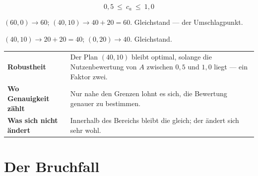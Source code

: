 \begin{merksatz}
\[ \boxed{\ 0{,}5 \ \le\ c_a \ \le\ 1{,}0\ } \]

 $(60,0) \to 60$; $(40,10) \to 40+20 = 60$. Gleichstand --- der Umschlagpunkt. \checkmark

 $(40,10) \to 20+20 = 40$; $(0,20) \to 40$. Gleichstand. \checkmark
\end{merksatz}

\begin{merksatz}
\begin{center}
{\small
\renewcommand{\arraystretch}{1.52}
\begin{tabular}{@{}P{2.6cm}P{6.0cm}@{}}
\toprule
\textbf{Robustheit} & Der Plan $(40,10)$ bleibt optimal, solange die Nutzenbewertung von $A$ zwischen $0{,}5$ und $1{,}0$ liegt --- ein Faktor zwei.\\
\textbf{Wo Genauigkeit zählt} & Nur nahe den Grenzen lohnt es sich, die Bewertung genauer zu bestimmen.\\
\textbf{Was sich nicht ändert} & Innerhalb des Bereichs bleibt die  gleich; der  ändert sich sehr wohl.\\
\bottomrule
\end{tabular}}
\end{center}

\begin{center}
\begin{minipage}{0.88\textwidth}
\end{minipage}
\end{center}
\end{merksatz}

\section{Der Bruchfall}

